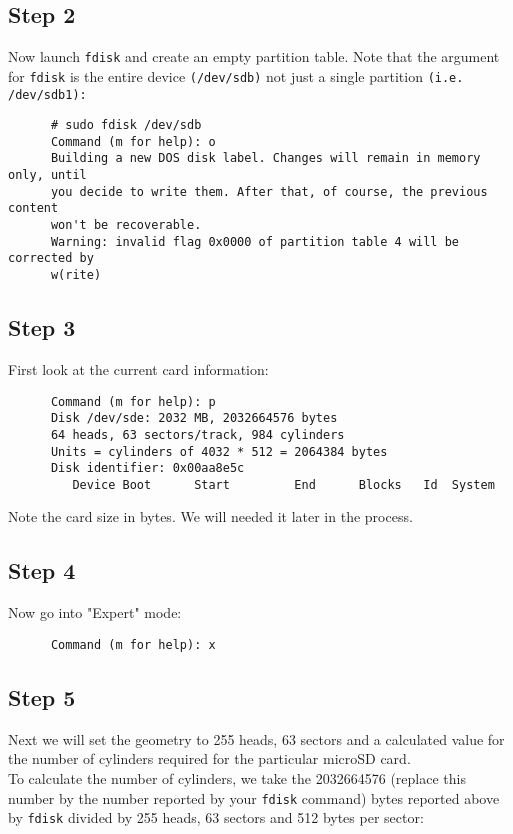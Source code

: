 \documentclass{article}
\begin{document}
   \subsection{Step 2}
      Now launch \texttt{fdisk} and create an empty partition table. Note that
      the argument for \texttt{fdisk} is the entire device \texttt{(/dev/sdb)}
      not just a single partition \texttt{(i.e. /dev/sdb1):} 
      \begin{verbatim}
      # sudo fdisk /dev/sdb 
      Command (m for help): o 
      Building a new DOS disk label. Changes will remain in memory only, until 
      you decide to write them. After that, of course, the previous content 
      won't be recoverable. 
      Warning: invalid flag 0x0000 of partition table 4 will be corrected by
      w(rite) 
      \end{verbatim}
   \subsection{Step 3}
      First look at the current card information: 
      \begin{verbatim}
      Command (m for help): p 
      Disk /dev/sde: 2032 MB, 2032664576 bytes 
      64 heads, 63 sectors/track, 984 cylinders 
      Units = cylinders of 4032 * 512 = 2064384 bytes 
      Disk identifier: 0x00aa8e5c 
         Device Boot      Start         End      Blocks   Id  System
      \end{verbatim}
      Note the card size in bytes. We will needed it later in the process.
   \subsection{Step 4}
      Now go into "Expert" mode: 
      \begin{verbatim}
      Command (m for help): x
      \end{verbatim}
   \subsection{Step 5}
      Next we will set the geometry to 255 heads, 63 sectors and a calculated
      value for the number of cylinders required for the particular microSD
      card. \\
      
      To calculate the number of cylinders, we take the 2032664576 (replace
      this number by the number reported by your \texttt{fdisk} command)
      bytes reported above by \texttt{fdisk} divided by 255 heads, 63 sectors
      and 512 bytes per sector: \\
\end{document}
